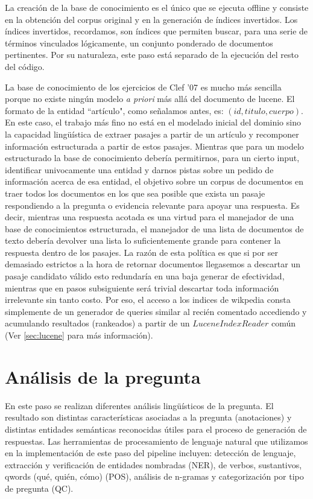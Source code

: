La creación de la base de conocimiento es el único que se ejecuta offline
y consiste en la obtención del corpus original y en la generación de índices
invertidos. Los índices invertidos, recordamos, son índices que permiten
buscar, para una serie de términos vinculados lógicamente, un conjunto
ponderado de documentos pertinentes. Por su naturaleza, este paso está 
separado de la ejecución del resto del código.


La base de conocimiento de los ejercicios de Clef '07 es mucho más sencilla 
porque no existe ningún modelo \emph{a priori} más allá del documento de lucene.
El formato de la entidad ``artículo", como señalamos antes, es: $(id, titulo, cuerpo)$. 
En este caso, el trabajo más fino no está en el modelado inicial del dominio 
sino la capacidad lingüística de extraer pasajes a partir de un artículo y recomponer información
estructurada a partir de estos pasajes. Mientras que para un modelo estructurado la base de conocimiento
debería permitirnos, para un cierto input, identificar univocamente una entidad y darnos pistas sobre un pedido de
información acerca de esa entidad, el objetivo sobre un corpus de documentos en 
traer todos los documentos en los que sea posible que exista un pasaje respondiendo a la pregunta o
evidencia relevante para apoyar una respuesta. Es decir, mientras una respuesta acotada es una virtud para
el manejador de una base de conocimientos estructurada, el manejador de una lista de documentos de texto debería devolver
una lista lo suficientemente grande para contener la respuesta dentro de los pasajes. La razón de esta política es que si
por ser demasiado estrictos a la hora de retornar documentos llegasemos a descartar un pasaje candidato válido esto
redundaría en una baja generar de efectividad, mientras que en pasos subsiguiente será trivial descartar toda información irrelevante
sin tanto costo. Por eso, el acceso a los indices de wikpedia consta simplemente de un generador de queries similar al recién comentado
accediendo y acumulando resultados (rankeados) a partir de un $LuceneIndexReader$ común (Ver \ref{sec:lucene}  para más información).


\bigskip

\section{Análisis de la pregunta}
\label{sec:qprocess}
En este paso se realizan diferentes análisis lingüísticos de la pregunta.
El resultado son distintas características asociadas a la pregunta (anotaciones)
y distintas entidades semánticas reconocidas útiles para el proceso de generación de respuestas. 
Las herramientas de procesamiento de lenguaje natural que utilizamos en 
la implementación de este paso del pipeline 
incluyen: detección de lenguaje, extracción y verificación de entidades nombradas (NER), 
de verbos, sustantivos, qwords (qué, quién, cómo) (POS), análisis de n-gramas y categorización por tipo de pregunta (QC).

